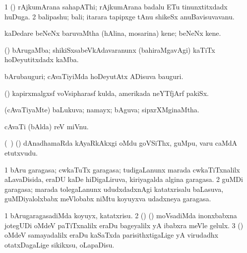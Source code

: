 {{{{{{\bentry
{} 
\gl{\nA}
\expl{}
\bmng
\bnum
\num{1} (\ca) rAjkumArana sahapAThi; rAjkumArana badalu ETu tinunxtitxdadx huDuga. 
\num{2} balipashu; bali; itarara tapipxge tAnu shikeSx anuBavisuvavanu. 
\enum
\emng
\eentry

\bentry
{} 
\gl{\nA}
\expl{}
\bmng
kaDedare beNeNx baruvaMtha (hAlina, mosarina) kene; beNeNx kene. 
\emng
\eentry

\bentry
{} 
\gl{\nA}
\expl{}
\bmng
(\ca) bArugaMba; shikiSxsabeVkAdavaranunx (bahiraMgavAgi) kaTiTx hoDeyutitxdadx kaMba. 
\emng
\eentry

\bentry
{} 
\gl{\nA}
\expl{}
\bmng
bArubauguri; cAvaTiyiMda hoDeyutAtx ADisuva bauguri. 
\emng
\eentry

\bentry
{} 
\gl{\nA}
\expl{}
\bmng
{} 
\emng
\eentry

\bentry
{} 
\gl{\nA}
\expl{}
\bmng
(\ame) kapirxmalgxsf voVsipharasf kulda, amerikada neYTfjArf pakiSx. 
\emng
\eentry

\bentry
{} 
\gl{\gu}
\bmng
(cAvaTiyaMte) baLukuva; namayx; bAguva; sipxrXMginaMtha. 
\emng
\eentry

\bentry
{} 
\gl{\nA}
\expl{}
\bmng
cAvaTi (bAlda) reV miVnu. 
\emng
\eentry

\bentry
{} 
\gl{\nA}
\expl{}
\bmng
(\kanmu\ \birx) (\AmA) dAnadhamaRda kAyaRkAkxgi oMdu goVSiThx, guMpu, \mo varu caMdA etutxvudu. 
\emng
\eentry

\bentry
{} 
\gl{\nA}
\expl{}
\bmng
\bnum
\num{1} bAru garagasa; cwkaTuTx garagasa; tudigaLanunx marada cwkaTiTxnalilx aLavaDisida, eraDU kaDe hiDigaLiruva, kiriyagalda algina garagasa. 
\num{2} guMDi garagasa; marada tolegaLanunx ududxdadxnAgi katatxrisalu baLasuva, guMDiyalolxbabx meVlobabx niMtu koyuyxva udadxneya garagasa. 
\enum
\emng
\eentry

\bentry
{} 
\gl{\kirx}


\noindent
\gl{\sakirx}
\expl{}
\bmng
\bnum
\num{1} bArugaragasadiMda koyuyx, katatxrisu. 
\num{2} (\ame) (\ashi) moVsadiMda inonxbabxna jotegUDi oMdeV paTiTxnalilx eraDu bageyalilx yA ibabxra meVle gelulx. 
\num{3} (\AmA) oMdeV samayadalilx eraDu kaSaTxda parisithxtigaLige yA virudadhx otatxDagaLige sikikxsu, oLapaDisu. 
\enum
\emng

}}}}}}
